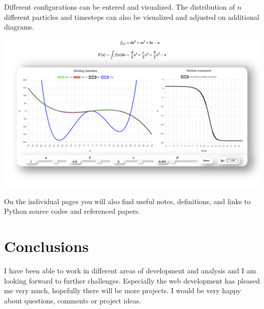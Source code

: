 \documentclass[a0,portrait]{a0poster}
\begin{document}
\begin{multicols}{3}
Different configurations can be entered and visualized. The distribution of \(n\) different particles and timesteps can also be visualized and adjusted on additional diagrams.

\begin{center}\vspace{1cm}
\includegraphics[width=.9\linewidth]{bmdf1.png}
\end{center}\vspace{1cm}
On the individual pages you will also find useful notes, definitions, and links to Python source codes and referenced papers.


\color{SaddleBrown} %

\section*{Conclusions}
I have been able to work in different areas of development and analysis and I am looking forward to further challenges. Especially the web development has pleased me very much, hopefully there will be more projects. I would be very happy about questions, comments or project ideas. 
\color{Black} %







\end{multicols}
\end{document}
